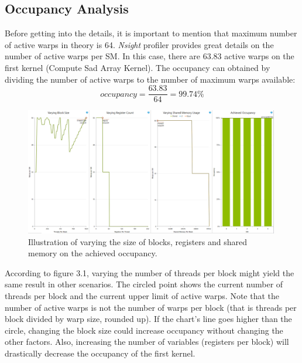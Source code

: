 \subsection{Occupancy Analysis}
Before getting into the details, it is important to mention that maximum number of active warps in theory is 64. \textit{Nsight} profiler provides great details on the number of active warps per SM. In this case, there are 63.83 active warps on the first kernel (Compute Sad Array Kernel). The occupancy can obtained by dividing the number of active warps to the number of maximum warps available:
\begin{equation}
	 occupancy = \frac{63.83}{64} = 99.74 \%
\end{equation}
\begin{figure}[!h]\centering
	\includegraphics[width=0.99\textwidth]{occupancy_analysis.PNG}
	\caption{Illustration of varying the size of blocks, registers and shared memory on the achieved occupancy.}
	\label{pl1}
\end{figure}

According to figure 3.1, varying the number of threads per block might yield the same result in other scenarios. The circled point shows the current number of threads per block and the current upper limit of active warps. Note that the number of active warps is not the number of warps per block (that is threads per block divided by warp size, rounded up). If the chart's line goes higher than the circle, changing the block size could increase occupancy without changing the other factors.  Also, increasing the number of variables (registers per block) will drastically decrease the occupancy of the first kernel.

